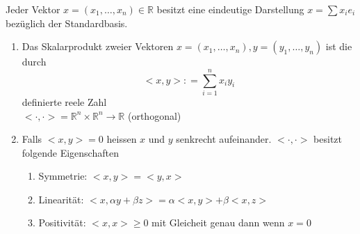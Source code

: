 Jeder Vektor $x=\left(x_1,\dots,x_n \right)\in\mathbb{R}$ besitzt eine eindeutige Darstellung $x=\sum x_ie_i$ bezüglich der Standardbasis.
\begin{definition}{2.16}
\begin{enumerate}
\item Das Skalarprodukt zweier Vektoren $x=\left(x_1,\dots,x_n \right),y=\left(y_1,\dots,y_n \right)$ ist die durch \[ < x,y > : = \sum\limits_{i = 1}^n {{x_i}{y_i}} \] definierte reele Zahl\\ $<\cdot,\cdot>=\mathbb{R}^n\times\mathbb{R}^n\rightarrow\mathbb{R}$ (orthogonal)
\item Falls $<x,y>=0$ heissen $x$ und $y$ senkrecht aufeinander. $<\cdot,\cdot>$ besitzt folgende Eigenschaften
\begin{enumerate}
\item Symmetrie: $<x,y>=<y,x>$
\item Linearität: $<x,\alpha y+\beta z>=\alpha <x,y>+\beta <x,z>$
\item Positivität: $<x,x>\geq 0$ mit Gleicheit genau dann wenn $x=0$
\end{enumerate}
\end{enumerate}
\end{definition}

